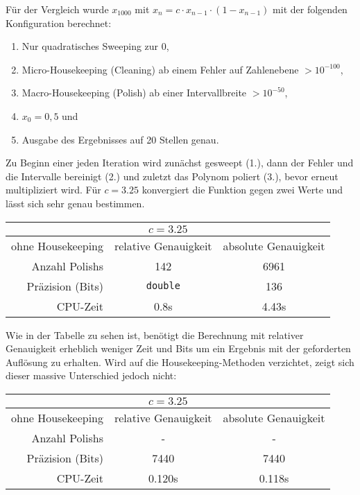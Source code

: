 Für der Vergleich wurde $x_{1000}$ mit $x_n = c \cdot x_{n-1} \cdot (1 - x_{n-1})$ mit der folgenden Konfiguration berechnet:
\begin{enumerate}
 \item Nur quadratisches Sweeping zur 0,
 \item Micro-Housekeeping (Cleaning) ab einem Fehler auf Zahlenebene $>10^{-100}$,
 \item Macro-Housekeeping (Polish) ab einer Intervallbreite $>10^{-50}$,
 \item $x_0 = 0,5$ und
 \item Ausgabe des Ergebnisses auf 20 Stellen genau.
\end{enumerate}
Zu Beginn einer jeden Iteration wird zunächst gesweept (1.), dann der Fehler und die Intervalle bereinigt (2.) und zuletzt das Polynom poliert (3.), bevor erneut multipliziert wird. Für $c = 3.25$ konvergiert die Funktion gegen zwei Werte und lässt sich sehr genau bestimmen.

\begin{center}
\begin{tabular}{|r|c|c|}
\hline
\multicolumn{3}{|c|}{$c=3.25$}\\
\hline
 ohne Housekeeping&relative Genauigkeit & absolute Genauigkeit \\
 \hline
 \hline
 Anzahl Polishs & 142 & 6961 \\
 Präzision (Bits) & \verb+double+ & 136 \\
 CPU-Zeit & 0.8s & 4.43s\\
 \hline
\end{tabular}
\end{center}

Wie in der Tabelle zu sehen ist, benötigt die Berechnung mit relativer Genauigkeit erheblich weniger Zeit und Bits um ein Ergebnis mit der geforderten Auflösung zu erhalten. Wird auf die Housekeeping-Methoden verzichtet, zeigt sich dieser massive Unterschied jedoch nicht:

\begin{center}
\begin{tabular}{|r|c|c|}
\hline
\multicolumn{3}{|c|}{$c=3.25$}\\
\hline
 ohne Housekeeping &relative Genauigkeit & absolute Genauigkeit \\
 \hline
 \hline
 Anzahl Polishs & -& -\\
 Präzision (Bits) & 7440 & 7440 \\
 CPU-Zeit & 0.120s & 0.118s\\
 \hline
\end{tabular}
\end{center}

